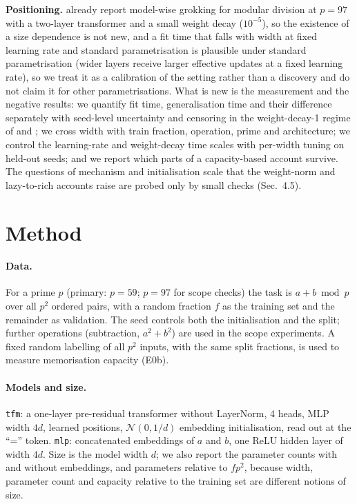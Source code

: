 \documentclass{article}
\begin{document}
\textbf{Positioning.} \citet{davies2023unifying} already report model-wise grokking for modular division at $p=97$ with a two-layer transformer and a small weight decay ($10^{-5}$), so the existence of a size dependence is not new, and a fit time that falls with width at fixed learning rate and standard parametrisation is plausible under standard parametrisation (wider layers receive larger effective updates at a fixed learning rate), so we treat it as a calibration of the setting rather than a discovery and do not claim it for other parametrisations. What is new is the measurement and the negative results: we quantify fit time, generalisation time and their difference separately with seed-level uncertainty and censoring in the weight-decay-1 regime of \citet{power2022grokking} and \citet{nanda2023progress}; we cross width with train fraction, operation, prime and architecture; we control the learning-rate and weight-decay time scales with per-width tuning on held-out seeds; and we report which parts of a capacity-based account survive. The questions of mechanism and initialisation scale that the weight-norm and lazy-to-rich accounts raise are probed only by small checks (Sec.~4.5).

\section{Method}\label{sec:method}
\paragraph{Data.} For a prime $p$ (primary: $p=59$; $p=97$ for scope checks) the task is $a+b \bmod p$ over all $p^2$ ordered pairs, with a random fraction $f$ as the training set and the remainder as validation. The seed controls both the initialisation and the split; further operations (subtraction, $a^2+b^2$) are used in the scope experiments. A fixed random labelling of all $p^2$ inputs, with the same split fractions, is used to measure memorisation capacity (E0b).

\paragraph{Models and size.} \texttt{tfm}: a one-layer pre-residual transformer without LayerNorm, 4 heads, MLP width $4d$, learned positions, $\mathcal N(0,1/d)$ embedding initialisation, read out at the ``='' token. \texttt{mlp}: concatenated embeddings of $a$ and $b$, one ReLU hidden layer of width $4d$. Size is the model width $d$; we also report the parameter counts with and without embeddings, and parameters relative to $fp^2$, because width, parameter count and capacity relative to the training set are different notions of size.
\end{document}
